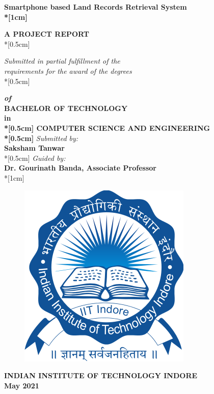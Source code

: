 \documentclass[12pt]{article}
\newcommand{\mainauth}{Saksham Tanwar}
\begin{document}

\begin{center}
    \textbf{\Huge{Smartphone based Land Records Retrieval System}\\*[1cm]}

    \textbf{A PROJECT REPORT}\\*[0.5cm]

    \textit{Submitted in partial fulfillment of the\\ requirements for the award of the degrees}\\*[0.5cm]

    {
        \bfseries
        \textit{of}\\
        BACHELOR OF TECHNOLOGY\\
        in\\*[0.5cm]
        COMPUTER SCIENCE AND ENGINEERING\\*[0.5cm]
    }
    \textit{Submitted by:}\\
    \textbf{\mainauth}\\*[0.5cm]
    \textit{Guided by:}\\
    \textbf{Dr. Gourinath Banda, Associate Professor}\\*[1cm]
    \begin{figure}[H]
        \includegraphics[scale=0.5]{iiti_logo}
        \centering
    \end{figure}
    \textbf{INDIAN INSTITUTE OF TECHNOLOGY INDORE}\\
    \textbf{May 2021}
    \thispagestyle{empty}
\end{center}
\clearpage

\end{document}
